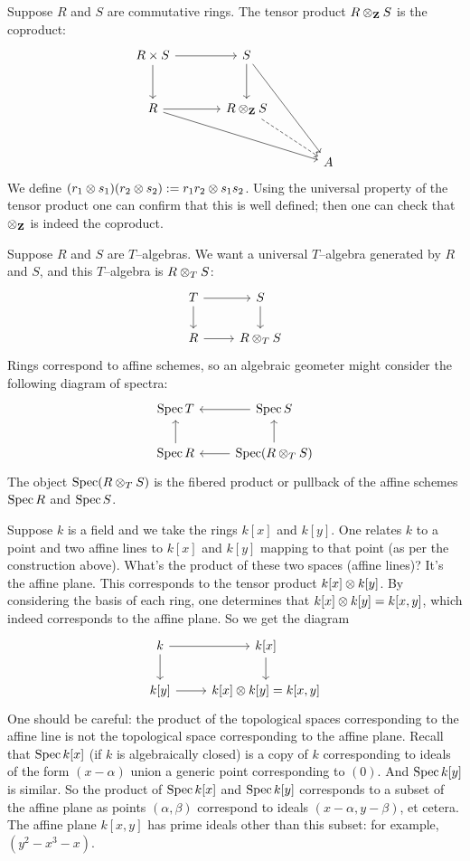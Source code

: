 \documentclass[11pt, oneside,margin=1in]{article}
\begin{document}
\begin{example}\label{}
Suppose $R$ and $S$ are commutative rings. The tensor product $R\otimes_\mathbf Z S$ is the coproduct: 
\[
\begin{tikzcd}[sep=large]
	R\times S \arrow[r] \arrow[d]& S \arrow[d] \arrow[rdd]\\
	R \arrow[r] \arrow[drr] & R\tensor_\Z S \arrow[rd, dashed] \\
				&&A
\end{tikzcd}
\]
We define $(r_1\otimes s_1) (r_2\otimes s_2):= r_1r_2\otimes s_1s_2$. Using the universal property of the tensor product one can confirm that this is well defined; then one can check that $\otimes_\mathbf Z$ is indeed the coproduct. 

Suppose $R$ and $S$ are $T$--algebras. We want a universal $T$--algebra generated by $R$ and $S$, and this $T$--algebra is $R\otimes_T S$:
\[
\begin{tikzcd}
	T \arrow[d] \arrow[r] & S \arrow[d]\\
	R \arrow[r] & R \tensor_T S
\end{tikzcd}
\]
Rings correspond to affine schemes, so an algebraic geometer might consider the following diagram of spectra:
\[
\begin{tikzcd}
	\Spec T & \Spec S \arrow[l] \\
	\Spec R \arrow[u] & \Spec(R\tensor_T S)  \arrow[u] \arrow[l]
\end{tikzcd}
\]
The object $\operatorname{Spec} (R\otimes_T S)$ is the fibered product or pullback of the affine schemes $\operatorname{Spec} R$ and $\operatorname{Spec} S$.

Suppose $k$ is a field and we take the rings $k[x]$ and $k[y]$. One relates $k$ to a point and two affine lines to $k[x]$ and $k[y]$ mapping to that point (as per the construction above). What's the product of these two spaces (affine lines)? It's the affine plane. This corresponds to the tensor product $k[x]\otimes k[y]$. By considering the basis of each ring, one determines that $k[x]\otimes k[y] = k[x,y]$, which indeed corresponds to the affine plane. So we get the diagram 
\[
\begin{tikzcd}
	k \arrow[d] \arrow[r] & k[x] \arrow[d]\\
        k[y] \arrow[r] &k[x]\tensor k[y] = k[x,y]
\end{tikzcd}
\]
One should be careful: the product of the topological spaces corresponding to the affine line is not the topological space corresponding to the affine plane. Recall that $\operatorname{Spec} k[x]$ (if $k$ is algebraically closed) is a copy of $k$ corresponding to ideals of the form $(x-\alpha)$ union a generic point corresponding to $(0)$. And $\operatorname{Spec} k[y]$ is similar. So the product of $\operatorname{Spec} k[x]$ and $\operatorname{Spec} k[y]$ corresponds to a subset of the affine plane as points $(\alpha,\beta)$ correspond to ideals $(x-\alpha, y-\beta)$, et cetera. The affine plane $k[x,y]$ has prime ideals other than this subset: for example, $(y^2-x^3-x)$. 
\end{example}
\end{document}
